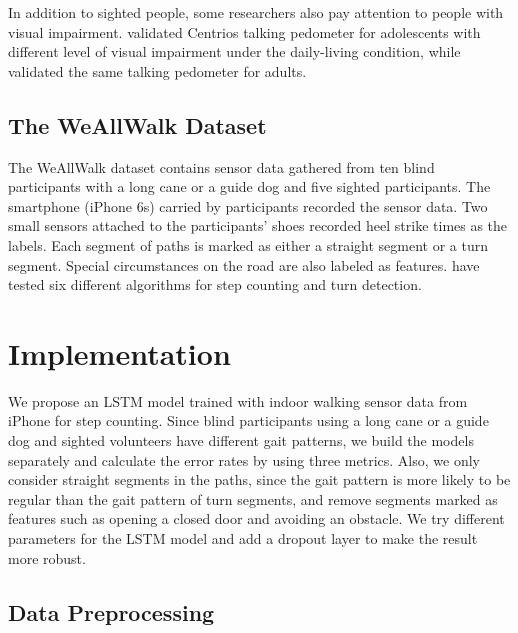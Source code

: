 \documentclass[11pt]{article}
\begin{document}
In addition to sighted people, some researchers also pay attention to people with visual impairment. \citep{haegele2015validation} validated Centrios talking pedometer for adolescents with different level of visual impairment under the daily-living condition, while  \citep{holbrook2011validation} validated the same talking pedometer for adults.



\subsection{The WeAllWalk Dataset}

The WeAllWalk dataset \citep{flores2016weallwalk} contains sensor data gathered from ten blind participants with a long cane or a guide dog and five sighted participants. The smartphone (iPhone 6s) carried by participants recorded the sensor data. Two small sensors attached to the participants’ shoes recorded heel strike times as the labels. Each segment of paths is marked as either a straight segment or a turn segment. Special circumstances on the road are also labeled as features. \citep{flores2016weallwalk} have tested six different algorithms for step counting and turn detection. 


\section{Implementation}
We propose an LSTM model trained with indoor walking sensor data from iPhone for step counting. Since blind participants using a long cane or a guide dog and sighted volunteers have different gait patterns, we build the models separately and calculate the error rates by using three metrics. Also, we only consider straight segments in the paths, since the gait pattern is more likely to be regular than the gait pattern of turn segments, and remove segments marked as features such as opening a closed door and avoiding an obstacle. We try different parameters for the LSTM model and add a dropout layer to make the result more robust.

\subsection{Data Preprocessing}
\end{document}
